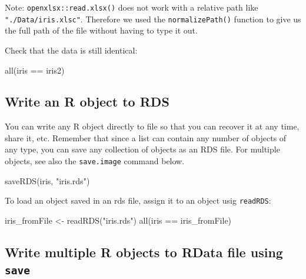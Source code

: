 \documentclass[
]{book}
\newenvironment{Shaded}{\begin{snugshade}}{\end{snugshade}}
\newcommand{\FunctionTok}[1]{\textcolor[rgb]{0.00,0.00,0.00}{#1}}
\newcommand{\NormalTok}[1]{#1}
\newcommand{\OtherTok}[1]{\textcolor[rgb]{0.56,0.35,0.01}{#1}}
\newcommand{\SpecialCharTok}[1]{\textcolor[rgb]{0.00,0.00,0.00}{#1}}
\newcommand{\StringTok}[1]{\textcolor[rgb]{0.31,0.60,0.02}{#1}}
\begin{document}
Note: \texttt{openxlsx::read.xlsx()} does not work with a relative path like \texttt{"./Data/iris.xlsc"}. Therefore we used the \texttt{normalizePath()} function to give us the full path of the file without having to type it out.

Check that the data is still identical:

\begin{Shaded}
\begin{Highlighting}[]
\FunctionTok{all}\NormalTok{(iris }\SpecialCharTok{==}\NormalTok{ iris2)}
\end{Highlighting}
\end{Shaded}

\hypertarget{write-an-r-object-to-rds}{%
\subsection{Write an R object to RDS}\label{write-an-r-object-to-rds}}

You can write any R object directly to file so that you can recover it at any time, share it, etc. Remember that since a list can contain any number of objects of any type, you can save any collection of objects as an RDS file. For multiple objects, see also the \texttt{save.image} command below.

\begin{Shaded}
\begin{Highlighting}[]
\FunctionTok{saveRDS}\NormalTok{(iris, }\StringTok{"iris.rds"}\NormalTok{)}
\end{Highlighting}
\end{Shaded}

To load an object saved in an rds file, assign it to an object usig \texttt{readRDS}:

\begin{Shaded}
\begin{Highlighting}[]
\NormalTok{iris\_fromFile }\OtherTok{\textless{}{-}} \FunctionTok{readRDS}\NormalTok{(}\StringTok{"iris.rds"}\NormalTok{)}
\FunctionTok{all}\NormalTok{(iris }\SpecialCharTok{==}\NormalTok{ iris\_fromFile)}
\end{Highlighting}
\end{Shaded}

\hypertarget{write-multiple-r-objects-to-rdata-file-using-save}{%
\subsection{\texorpdfstring{Write multiple R objects to RData file using \texttt{save}}{Write multiple R objects to RData file using save}}\label{write-multiple-r-objects-to-rdata-file-using-save}}
\end{document}
